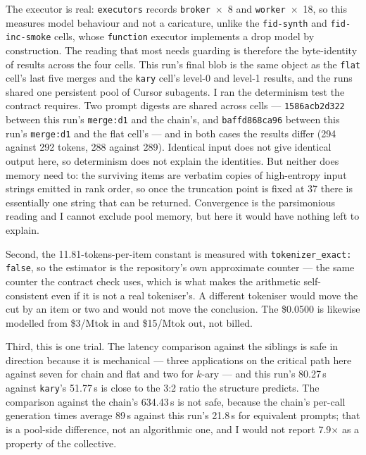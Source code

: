 \documentclass[11pt]{article}
\begin{document}
The executor is real: \texttt{executors} records \texttt{broker}~$\times$~8 and
\texttt{worker}~$\times$~18, so this measures model behaviour and not a caricature, unlike
the \texttt{fid-synth} and \texttt{fid-inc-smoke} cells, whose \texttt{function} executor
implements a drop model by construction. The reading that most needs guarding is
therefore the byte-identity of results across the four cells. This run's final blob is the
same object as the \texttt{flat} cell's last five merges and the \texttt{kary} cell's
level-0 and level-1 results, and the runs shared one persistent pool of Cursor subagents.
I ran the determinism test the contract requires. Two prompt digests are shared across
cells --- \texttt{1586acb2d322} between this run's \texttt{merge:d1} and the chain's, and
\texttt{baffd868ca96} between this run's \texttt{merge:d1} and the flat cell's --- and in
both cases the results differ (294 against 292 tokens, 288 against 289). Identical input
does not give identical output here, so determinism does not explain the identities. But
neither does memory need to: the surviving items are verbatim copies of high-entropy input
strings emitted in rank order, so once the truncation point is fixed at 37 there is
essentially one string that can be returned. Convergence is the parsimonious reading and I
cannot exclude pool memory, but here it would have nothing left to explain.

Second, the 11.81-tokens-per-item constant is measured with \texttt{tokenizer\_exact:
false}, so the estimator is the repository's own approximate counter --- the same counter
the contract check uses, which is what makes the arithmetic self-consistent even if it is
not a real tokeniser's. A different tokeniser would move the cut by an item or two and
would not move the conclusion. The \$0.0500 is likewise modelled from
\$3/Mtok in and \$15/Mtok out, not billed.

Third, this is one trial. The latency comparison against the siblings is safe in direction
because it is mechanical --- three applications on the critical path here against seven
for chain and flat and two for $k$-ary --- and this run's 80.27\,s against
\texttt{kary}'s 51.77\,s is close to the 3:2 ratio the structure predicts. The comparison
against the chain's 634.43\,s is not safe, because the chain's per-call generation times
average 89\,s against this run's 21.8\,s for equivalent prompts; that is a pool-side
difference, not an algorithmic one, and I would not report 7.9$\times$ as a property of
the collective.
\end{document}
